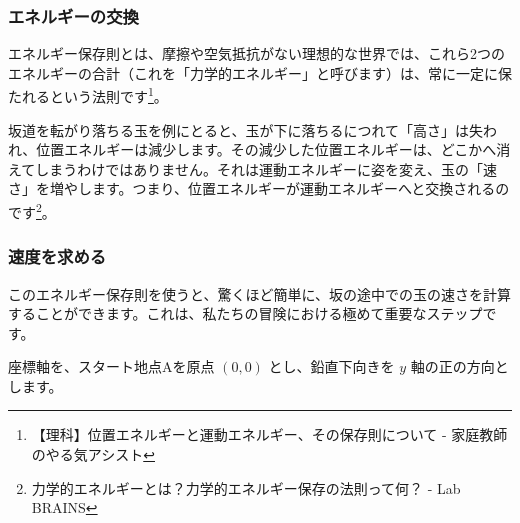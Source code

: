 \documentclass[a4paper,12pt]{bxjsarticle}
\begin{document}
\subsubsection{エネルギーの交換}

エネルギー保存則とは、摩擦や空気抵抗がない理想的な世界では、これら2つのエネルギーの合計（これを「力学的エネルギー」と呼びます）は、常に一定に保たれるという法則です\footnote{【理科】位置エネルギーと運動エネルギー、その保存則について - 家庭教師のやる気アシスト}。

坂道を転がり落ちる玉を例にとると、玉が下に落ちるにつれて「高さ」は失われ、位置エネルギーは減少します。その減少した位置エネルギーは、どこかへ消えてしまうわけではありません。それは運動エネルギーに姿を変え、玉の「速さ」を増やします。つまり、位置エネルギーが運動エネルギーへと交換されるのです\footnote{力学的エネルギーとは？力学的エネルギー保存の法則って何？ - Lab BRAINS}。

\subsubsection{速度を求める}

このエネルギー保存則を使うと、驚くほど簡単に、坂の途中での玉の速さを計算することができます。これは、私たちの冒険における極めて重要なステップです。

座標軸を、スタート地点Aを原点 $(0,0)$ とし、鉛直下向きを $y$ 軸の正の方向とします。
\end{document}
